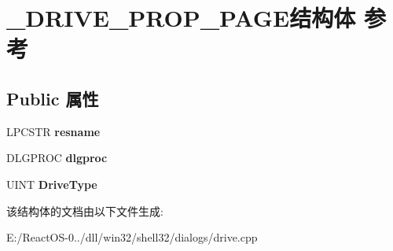 \hypertarget{struct___d_r_i_v_e___p_r_o_p___p_a_g_e}{}\section{\+\_\+\+D\+R\+I\+V\+E\+\_\+\+P\+R\+O\+P\+\_\+\+P\+A\+G\+E结构体 参考}
\label{struct___d_r_i_v_e___p_r_o_p___p_a_g_e}
\subsection*{Public 属性}
\begin{DoxyCompactItemize}
\item 
\mbox{\label{struct___d_r_i_v_e___p_r_o_p___p_a_g_e_ac10225b3af95adc78e779f0e54a8b162}} 
L\+P\+C\+S\+TR {\bfseries resname}
\item 
\mbox{\label{struct___d_r_i_v_e___p_r_o_p___p_a_g_e_a47868547af2bd8501c3b0125ccda6926}} 
D\+L\+G\+P\+R\+OC {\bfseries dlgproc}
\item 
\mbox{\label{struct___d_r_i_v_e___p_r_o_p___p_a_g_e_aa864d0808032ca37375df125a069e880}} 
U\+I\+NT {\bfseries Drive\+Type}
\end{DoxyCompactItemize}


该结构体的文档由以下文件生成\+:\begin{DoxyCompactItemize}
\item 
E\+:/\+React\+O\+S-\/0../dll/win32/shell32/dialogs/drive.\+cpp\end{DoxyCompactItemize}
